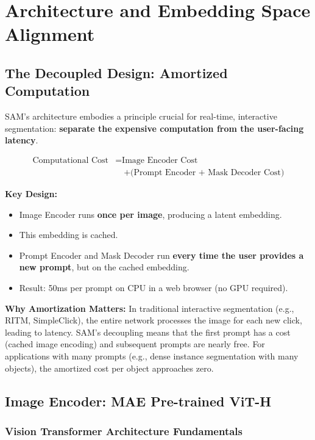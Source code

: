 \section{Architecture and Embedding Space Alignment}

\subsection{The Decoupled Design: Amortized Computation}

SAM's architecture embodies a principle crucial for real-time, interactive segmentation: \textbf{separate the expensive computation from the user-facing latency}.

\[
\begin{aligned}
	\text{Computational Cost} &= \text{Image Encoder Cost} \\
	&\quad + \text{(Prompt Encoder + Mask Decoder Cost)}
\end{aligned}
\]

\textbf{Key Design:}
\begin{itemize}
    \item Image Encoder runs \textbf{once per image}, producing a latent embedding.
    \item This embedding is cached.
    \item Prompt Encoder and Mask Decoder run \textbf{every time the user provides a new prompt}, but on the cached embedding.
    \item Result: 50ms per prompt on CPU in a web browser (no GPU required).
\end{itemize}

\textbf{Why Amortization Matters:}
In traditional interactive segmentation (e.g., RITM, SimpleClick), the entire network processes the image for each new click, leading to latency. SAM's decoupling means that the first prompt has a cost (cached image encoding) and subsequent prompts are nearly free. For applications with many prompts (e.g., dense instance segmentation with many objects), the amortized cost per object approaches zero.

\subsection{Image Encoder: MAE Pre-trained ViT-H}

\subsubsection{Vision Transformer Architecture Fundamentals}

